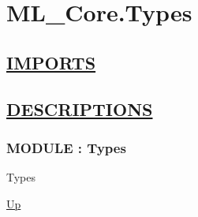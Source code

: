 \chapter*{ML\_Core.Types}
\hypertarget{ecldoc:toc:ML_Core.Types}{}

\section*{\underline{IMPORTS}}

\section*{\underline{DESCRIPTIONS}}
\subsection*{MODULE : Types}
\hypertarget{ecldoc:ML_Core.Types}{}
\begin{minipage}[t]{\textwidth}
\begin{flushleft}
 Types 
\end{flushleft}
\end{minipage}
\hyperlink{ecldoc:toc:ML_Core}{Up}

